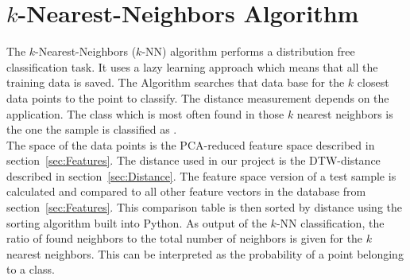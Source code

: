 \section{$k$-Nearest-Neighbors Algorithm}
\label{sec:TheoryKnn}
The $k$-Nearest-Neighbors ($k$-NN) algorithm performs a distribution free classification task. It uses a lazy learning approach which means that all the training data is saved. The Algorithm searches that data base for the $k$ closest data points to the point to classify. The distance measurement depends on the application. The class which is most often found in those $k$ nearest neighbors is the one the sample is classified as \cite[p.~338~f.]{bib:Alzate2007}.\\
The space of the data points is the PCA-reduced feature space described in section~\ref{sec:Features}. The distance used in our project is the DTW-distance described in section~\ref{sec:Distance}. The feature space version of a test sample is calculated and compared to all other feature vectors in the database from section~\ref{sec:Features}. This comparison table is then sorted by distance using the sorting algorithm built into Python. As output of the $k$-NN classification, the ratio of found neighbors to the total number of neighbors is given for the $k$ nearest neighbors. This can be interpreted as the probability of a point belonging to a class.
